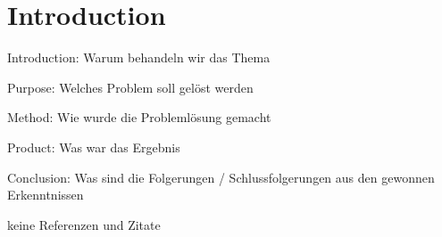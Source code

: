 


\chapter*{Introduction}
\label{ch:abstract}

Introduction: Warum behandeln wir das Thema

Purpose: Welches Problem soll gelöst werden

Method: Wie wurde die Problemlösung gemacht

Product: Was war das Ergebnis

Conclusion: Was sind die Folgerungen / Schlussfolgerungen aus den gewonnen Erkenntnissen

keine Referenzen und Zitate

